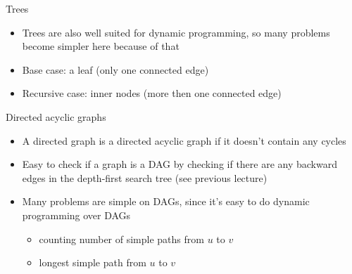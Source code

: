 \documentclass[12pt,t]{beamer}
\newcommand{\bi}{\begin{itemize}}
\newcommand{\ei}{\end{itemize}}
\begin{document}
\begin{frame}{Trees}
    \vspace{30pt}
    \bi
        \item Trees are also well suited for dynamic programming, so many problems become simpler here because of that
        \item Base case: a leaf (only one connected edge)
        \item Recursive case: inner nodes (more then one connected edge)
    \ei
\end{frame}

\begin{frame}{Directed acyclic graphs}
    \vspace{20pt}
    \bi
        \item A directed graph is a directed acyclic graph if it doesn't contain any cycles
    \vspace{10pt}
\item Easy to check if a graph is a DAG by checking if there are any backward edges in the depth-first search tree (see previous lecture)
    \vspace{10pt}
\item Many problems are simple on DAGs, since it's easy to do dynamic programming over DAGs
        \bi
            \item counting number of simple paths from $u$ to $v$
            \item longest simple path from $u$ to $v$
        \ei
    \ei
\end{frame}


% 
\end{document}
